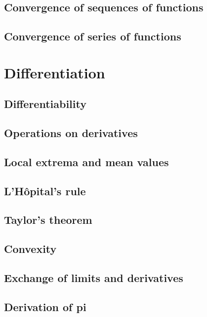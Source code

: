 \subsection{Convergence of sequences of functions}

\subsection{Convergence of series of functions}

\section{Differentiation}

\subsection{Differentiability}

\subsection{Operations on derivatives}

\subsection{Local extrema and mean values}

\subsection{L'Hôpital's rule}

\subsection{Taylor's theorem}

\subsection{Convexity}

\subsection{Exchange of limits and derivatives}

\subsection{Derivation of pi}

